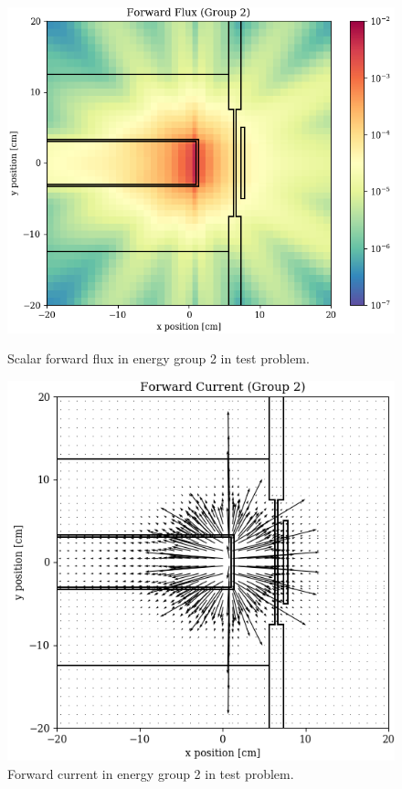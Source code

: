 \begin{figure}
  \begin{minipage}{0.49\linewidth}
    \centering
    \includegraphics[width=\linewidth]{content/testprob/scalar_flux_fwd_g02.png}
    \caption{Scalar forward flux in energy group 2 in test problem.}
    \label{fig:tp:scalar_flux_fwd_g02}
  \end{minipage}
  \hfill
  \begin{minipage}{0.49\linewidth}
    \centering
    \includegraphics[width=\linewidth]{content/testprob/current_fwd_g02.png}
    \caption{Forward current in energy group 2 in test problem.}
    \label{fig:tp:current_fwd_g02}
  \end{minipage}
\end{figure}

